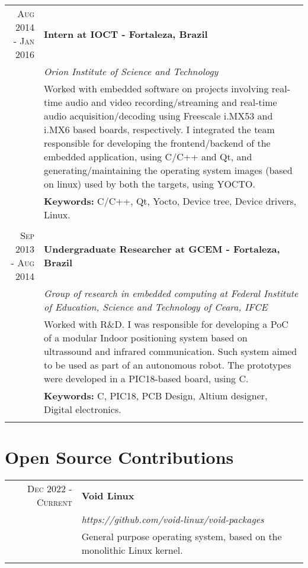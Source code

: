 \documentclass[a4paper,10pt]{article}
\begin{document}
  \begin{tabular}{r|p{11cm}}
    \textsc{Aug 2014 - Jan 2016} & \textbf{Intern at IOCT - Fortaleza, Brazil}\\&\emph{Orion Institute of Science and Technology}\\&\footnotesize{Worked with embedded software on projects involving real-time audio and video recording/streaming and real-time audio acquisition/decoding using Freescale i.MX53 and i.MX6 based boards, respectively. I integrated the team responsible for developing the frontend/backend of the embedded application, using C/C++ and Qt, and generating/maintaining the operating system images (based on linux) used by both the targets, using YOCTO.}
    \\ & \footnotesize{\textbf{Keywords:} C/C++, Qt, Yocto, Device tree, Device drivers, Linux.}
    \\\multicolumn{2}{c}{} \\

    \textsc{Sep 2013 - Aug 2014} & \textbf{Undergraduate Researcher at GCEM - Fortaleza, Brazil} \\&\emph{Group of research in embedded computing at Federal Institute of Education,
    Science and Technology of Ceara, IFCE}\\&\footnotesize{Worked with R\&D. I was responsible for developing a PoC of a modular Indoor positioning system based on ultrassound and infrared communication. Such system aimed to be used as part of an autonomous robot. The prototypes were developed in a PIC18-based board, using C.}
    \\ & \footnotesize{\textbf{Keywords:} C, PIC18, PCB Design, Altium designer, Digital electronics.}
    \\\multicolumn{2}{c}{}

  \end{tabular}

  \section{Open Source Contributions}
  \begin{tabular}{r|p{11cm}}
    \textsc{Dec 2022 - Current} & \textbf{Void Linux} \\&\emph{https://github.com/void-linux/void-packages}
    \\&\footnotesize{General purpose operating system, based on the monolithic Linux kernel.}
    \\\multicolumn{2}{c}{}
  \end{tabular}
\end{document}

